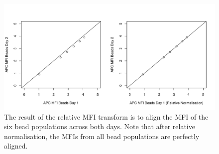\documentclass[11pt]{article}
\begin{document}
%
\begin{figure}
  \centering
  \includegraphics{./plotMFIrepeatability}
  \caption{
  \label{fig:relativeNormalisation}
  The result of the relative MFI transform is to align the MFI of the six bead populations across both days.
  Note that after relative normalisation, the MFIs from all bead populations are perfectly aligned.
  }
\end{figure}



\clearpage

 

\end{document}
